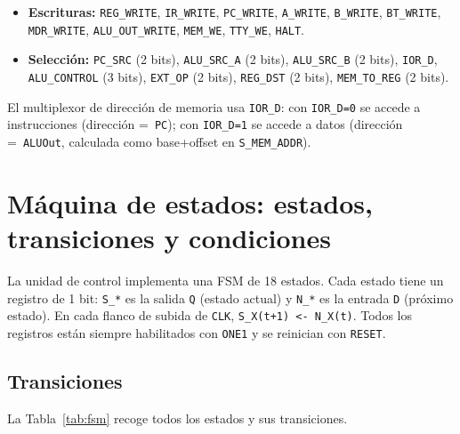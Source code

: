 \documentclass[11pt,a4paper]{article}
\begin{document}
\begin{itemize}
  \item \textbf{Escrituras:} \texttt{REG\_WRITE}, \texttt{IR\_WRITE}, \texttt{PC\_WRITE}, \texttt{A\_WRITE}, \texttt{B\_WRITE}, \texttt{BT\_WRITE}, \texttt{MDR\_WRITE}, \texttt{ALU\_OUT\_WRITE}, \texttt{MEM\_WE}, \texttt{TTY\_WE}, \texttt{HALT}.
  \item \textbf{Selección:} \texttt{PC\_SRC} (2 bits), \texttt{ALU\_SRC\_A} (2 bits), \texttt{ALU\_SRC\_B} (2 bits), \texttt{IOR\_D}, \texttt{ALU\_CONTROL} (3 bits), \texttt{EXT\_OP} (2 bits), \texttt{REG\_DST} (2 bits), \texttt{MEM\_TO\_REG} (2 bits).
\end{itemize}

El multiplexor de dirección de memoria usa \texttt{IOR\_D}: con \texttt{IOR\_D=0} se accede a instrucciones (dirección =\ \texttt{PC}); con \texttt{IOR\_D=1} se accede a datos (dirección =\ \texttt{ALUOut}, calculada como base+offset en \texttt{S\_MEM\_ADDR}).

\section{Máquina de estados: estados, transiciones y condiciones}

La unidad de control implementa una FSM de 18 estados. Cada estado tiene un registro de 1 bit: \texttt{S\_*} es la salida \texttt{Q} (estado actual) y \texttt{N\_*} es la entrada \texttt{D} (próximo estado). En cada flanco de subida de \texttt{CLK}, \texttt{S\_X(t+1) <- N\_X(t)}. Todos los registros están siempre habilitados con \texttt{ONE1} y se reinician con \texttt{RESET}.

\subsection{Transiciones}

La Tabla~\ref{tab:fsm} recoge todos los estados y sus transiciones.
\end{document}
